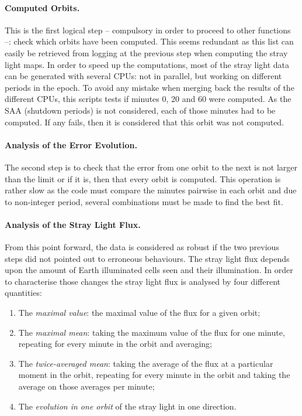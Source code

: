 \documentclass[a4paper,10pt]{article}
\begin{document}
\paragraph{Computed Orbits.} This is the first logical step -- compulsory in order to proceed to other functions --: check which orbits have been computed. This seems redundant as this list can easily be retrieved from logging at the previous step when computing the stray light maps. In order to speed up the computations, most of the stray light data can be generated with several CPUs: not in parallel, but working on different periods in the epoch. To avoid any mistake when merging back the results of the different CPUs, this scripts tests if minutes 0, 20 and 60 were computed. As the SAA (shutdown periods) is not considered, each of those minutes had to be computed. If any fails, then it is considered that this orbit was not computed.

\paragraph{Analysis of the Error Evolution.} The second step is to check that the error from one orbit to the next is not larger than the limit or if it is, then that every orbit is computed. This operation is rather slow as the code must compare the minutes pairwise in each orbit and due to non-integer period, several combinations must be made to find the best fit. 

\paragraph{Analysis of the Stray Light Flux.} From this point forward, the data is considered as robust if the two previous steps did not pointed out to erroneous behaviours. The stray light flux depends upon the amount of Earth illuminated cells seen and their illumination. In order to characterise those changes the stray light flux is analysed by four different quantities:
\begin{enumerate}
 \item The \emph{maximal value}: the maximal value of the flux for a given orbit;
 \item The \emph{maximal mean}: taking the maximum value of the flux for one minute, repeating for every minute in the orbit and averaging;
 \item The \emph{twice-averaged mean}: taking the average of the flux at a particular moment in the orbit, repeating for every minute in the orbit and taking the average on those averages per minute;
 \item The \emph{evolution in one orbit} of the stray light in one direction.
\end{enumerate}
\end{document}
